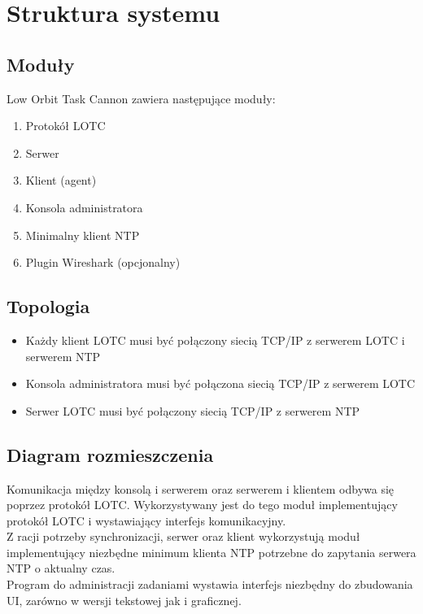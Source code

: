 \documentclass[10pt,a4paper]{article}
\begin{document}
	\section{Struktura systemu}
	    \subsection{Moduły}	
		    Low Orbit Task Cannon zawiera następujące moduły:
		
			\begin{enumerate}
		        \item Protokół LOTC
		        \item Serwer
		        \item Klient (agent)
		        \item Konsola administratora
		        \item Minimalny klient NTP
		        \item Plugin Wireshark (opcjonalny)
		    \end{enumerate}
		    
		    \subsection{Topologia}
			    \begin{itemize}
			        \item Każdy klient LOTC musi być połączony siecią TCP/IP z serwerem LOTC i serwerem NTP 
			        \item Konsola administratora musi być połączona siecią TCP/IP z serwerem LOTC 
			        \item Serwer LOTC musi być połączony siecią TCP/IP z serwerem NTP
			    \end{itemize}
			    \begin{figure}[H]
					\centering
					\def\svgwidth{\columnwidth}
					
				\end{figure}
		    
		    \subsection{Diagram rozmieszczenia}
		    Komunikacja między konsolą i serwerem oraz serwerem i klientem odbywa się poprzez protokół LOTC. Wykorzystywany jest do tego moduł implementujący protokół LOTC i wystawiający interfejs komunikacyjny. \\
		    Z racji potrzeby synchronizacji, serwer oraz klient wykorzystują moduł implementujący niezbędne minimum klienta NTP potrzebne do zapytania serwera NTP o aktualny czas. \\
		    Program do administracji zadaniami wystawia interfejs niezbędny do zbudowania UI, zarówno w wersji tekstowej jak i graficznej. 
			    \begin{figure}[H]
					\centering
					\def\svgwidth{\columnwidth}
					
				\end{figure}
	    
\end{document}
